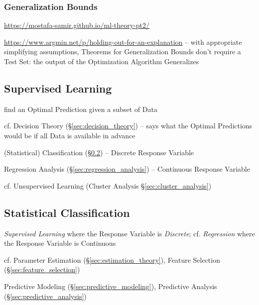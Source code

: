 \subsubsection{Generalization Bounds}\label{sec:generalization_bounds}

\url{https://mostafa-samir.github.io/ml-theory-pt2/}

\url{https://www.argmin.net/p/holding-out-for-an-explanation} -- with
appropriate simplifying assumptions, Theorems for Generalization Bounds
don't require a Test Set: the output of the Optimization Algorithm Generalizes


\subsection{Supervised Learning}\label{sec:supervised_learning}

find an Optimal Prediction given a subset of Data

cf. Decision Theory (\S\ref{sec:decision_theory}) -- says what the Optimal
Predictions would be if all Data is available in advance

(Statistical) Classification (\S\ref{sec:classification}) -- Discrete Response
Variable

Regression Analysis (\S\ref{sec:regression_analysis}) -- Continuous Response
Variable

cf. Unsupervised Learning (Cluster Analysis \S\ref{sec:cluster_analysis})



\subsection{Statistical Classification}\label{sec:classification}

\emph{Supervised Learning} where the Response Variable is \emph{Discrete}; cf.
\emph{Regression} where the Response Variable is Continuous

cf. Parameter Estimation (\S\ref{sec:estimation_theory}), Feature Selection
(\S\ref{sec:feature_selection})

\fist Predictive Modeling (\S\ref{sec:predictive_modeling}), Predictive Analysis
(\S\ref{sec:predictive_analysis})

